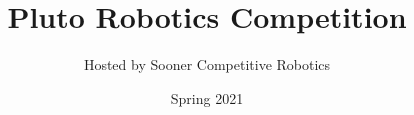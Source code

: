 \documentclass[a4paper,12pt]{article}
\title{Pluto Robotics Competition}
\author{Hosted by Sooner Competitive Robotics}
\date{Spring 2021}
\begin{document}
\maketitle

\newpage

\let\cleardoublepage=\clearpage

\tableofcontents

\newpage










\end{document}
